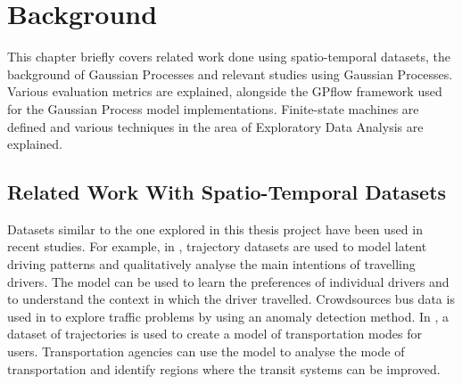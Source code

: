 \chapter{Background}
\label{cha:background}

This chapter briefly covers related work done using spatio-temporal datasets, the background of Gaussian Processes and relevant studies using Gaussian Processes. 
Various evaluation metrics are explained, alongside the GPflow framework used for the Gaussian Process model implementations.
Finite-state machines are defined and various techniques in the area of Exploratory Data Analysis are explained. 

\section{Related Work With Spatio-Temporal Datasets}
Datasets similar to the one explored in this thesis project have been used in recent studies.
For example, in \cite{JIT1699}, trajectory datasets are used to model latent driving patterns and qualitatively analyse the main intentions of travelling drivers.
The model can be used to learn the preferences of individual drivers and to understand the context in which the driver travelled.
Crowdsources bus data is used in \cite{Kong2018} to explore traffic problems by using an anomaly detection method.
In \cite{DABIRI2018360}, a dataset of trajectories is used to create a model of transportation modes for users.
Transportation agencies can use the model to analyse the mode of transportation and identify regions where the transit systems can be improved. 


